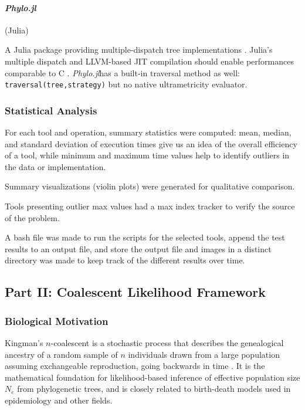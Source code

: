 \documentclass[11pt, a4paper]{article}
\newcommand{\phylo}{\textit{Phylo.jl}}
\begin{document}
\paragraph{\phylo} (Julia)

A Julia package providing multiple-dispatch tree implementations \cite{phylojl2024}. Julia's multiple dispatch and LLVM-based JIT compilation should enable performances comparable to C \cite{bezanson2017julia}. \phylo has a built-in traversal method as well: \texttt{traversal(tree,strategy)} but no native ultrametricity evaluator. 

\subsubsection{Statistical Analysis}

For each tool and operation, summary statistics were computed: mean, median, and standard deviation of execution times give us an idea of the overall efficiency of a tool, while minimum and maximum time values help to identify outliers in the data or implementation.  

Summary visualizations (violin plots) were generated for qualitative comparison.

Tools presenting outlier max values had a max index tracker to verify the source of the problem.

A bash file was made to run the scripts for the selected tools, append the test results to an output file, and store the output file and images in a distinct directory was made to keep track of the different results over time.

\subsection{Part II: Coalescent Likelihood Framework}

\subsubsection{Biological Motivation}

Kingman's $n$-coalescent is a stochastic process that describes the genealogical ancestry of a random sample of $n$ individuals drawn from a large population assuming exchangeable reproduction, going backwards in time \cite{kingman1982}. It is the mathematical foundation for likelihood-based inference of effective population size $N_e$ from phylogenetic trees, and is closely related to birth-death models used in epidemiology and other fields.
\end{document}
